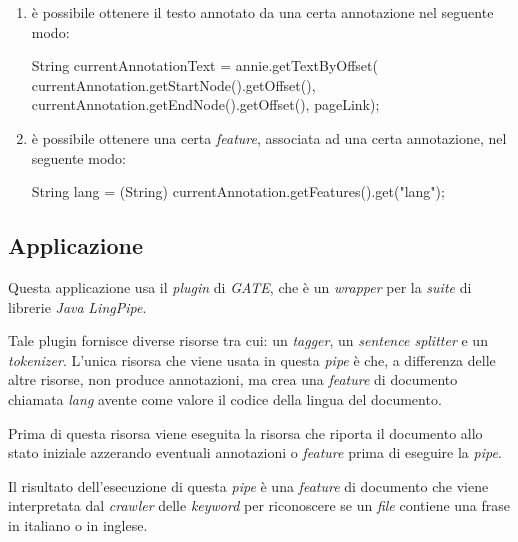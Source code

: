 \documentclass[tesi.tex]{subfiles}
\begin{document}
\begin{enumerate}
\item \`e possibile ottenere il testo annotato da una certa
  annotazione nel seguente modo:
  \begin{javablock}
String currentAnnotationText = annie.getTextByOffset(
                        currentAnnotation.getStartNode().getOffset(),
                        currentAnnotation.getEndNode().getOffset(),
                        pageLink);
  \end{javablock}

\item \`e possibile ottenere una certa \emph{feature}, associata ad una
  certa annotazione, nel seguente modo:
  \begin{javablock}
String lang = (String) currentAnnotation.getFeatures().get("lang");
  \end{javablock}
\end{enumerate}

\subsection{Applicazione }
Questa applicazione usa il \emph{plugin}  di
\emph{GATE}, che \`e un \emph{wrapper} per la \emph{suite} di librerie
\emph{Java} \emph{LingPipe}.

Tale plugin fornisce diverse risorse tra cui: un \emph{tagger}, un
\emph{sentence splitter} e un \emph{tokenizer}. L'unica risorsa che
viene usata in questa \emph{pipe} \`e  che, a differenza delle altre risorse, non produce
annotazioni, ma crea una \emph{feature} di documento chiamata
\emph{lang} avente come valore il codice della lingua del documento.

Prima di questa risorsa viene eseguita la risorsa  che riporta il documento allo stato iniziale azzerando
eventuali annotazioni o \emph{feature} prima di
eseguire la \emph{pipe}.

Il risultato dell'esecuzione di questa \emph{pipe} \`e una
\emph{feature} di documento che viene interpretata dal \emph{crawler}
delle \emph{keyword} per riconoscere se un \emph{file} contiene una
frase in italiano o in inglese.
\end{document}
